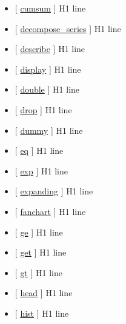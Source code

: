 \documentclass[letterpaper,10pt,english]{sphinxmanual}
\begin{document}
\begin{itemize}
\item {} 
{[} {\hyperref[classes/time_series/@ts/ts:cumsum]{cumsum}} {]}   H1 line

\item {} 
{[} {\hyperref[classes/time_series/@ts/ts:decompose-series]{decompose\_series}} {]}   H1 line

\item {} 
{[} {\hyperref[classes/time_series/@ts/ts:describe]{describe}} {]}   H1 line

\item {} 
{[} {\hyperref[classes/time_series/@ts/ts:display]{display}} {]}   H1 line

\item {} 
{[} {\hyperref[classes/time_series/@ts/ts:double]{double}} {]}   H1 line

\item {} 
{[} {\hyperref[classes/time_series/@ts/ts:drop]{drop}} {]}   H1 line

\item {} 
{[} {\hyperref[classes/time_series/@ts/ts:dummy]{dummy}} {]}   H1 line

\item {} 
{[} {\hyperref[classes/time_series/@ts/ts:eq]{eq}} {]}   H1 line

\item {} 
{[} {\hyperref[classes/time_series/@ts/ts:exp]{exp}} {]}   H1 line

\item {} 
{[} {\hyperref[classes/time_series/@ts/ts:expanding]{expanding}} {]}   H1 line

\item {} 
{[} {\hyperref[classes/time_series/@ts/ts:fanchart]{fanchart}} {]}   H1 line

\item {} 
{[} {\hyperref[classes/time_series/@ts/ts:ge]{ge}} {]}   H1 line

\item {} 
{[} {\hyperref[classes/time_series/@ts/ts:get]{get}} {]}   H1 line

\item {} 
{[} {\hyperref[classes/time_series/@ts/ts:gt]{gt}} {]}   H1 line

\item {} 
{[} {\hyperref[classes/time_series/@ts/ts:head]{head}} {]}   H1 line

\item {} 
{[} {\hyperref[classes/time_series/@ts/ts:hist]{hist}} {]}   H1 line


\end{itemize}
\end{document}
